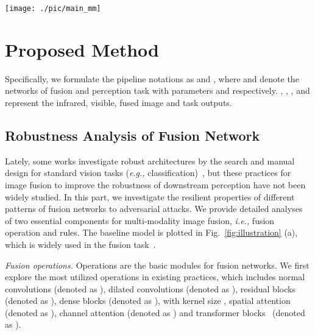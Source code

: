 \documentclass[sigconf]{acmart}
\begin{document}
\begin{figure*}[htb]
	\centering
	\texttt{[image: ./pic/main\_mm]}
	\vspace{-0.4cm}
	\caption{{The schematic graph of the proposed framework. We first illustrate the pipeline to evaluate the robustness of diverse fusion operations and rules for segmentation in subfigure (a). In subfigure (b), we propose a decomposition-based network with a harmonized search strategy for robust architecture. Finally, we depict the adaptive adversarial training in subfigure (c).}}
	\label{fig:illustration}
\end{figure*}

\section{Proposed Method}
Specifically, we  formulate the pipeline notations as   and
, where  and  denote the networks of fusion and perception task with parameters  and  respectively. , , , and  represent the infrared, visible, fused image and task outputs. 




\subsection{Robustness Analysis of Fusion Network}
Lately, some works investigate robust architectures by the search and manual design for standard vision tasks (\textit{e.g.,} classification)~\cite{su2018robustness,mao2022towards}, but these practices for image fusion to improve the robustness of downstream perception have not been widely studied.
In this part, we investigate the resilient properties of different patterns of fusion networks to adversarial attacks.
We provide detailed analyses of two essential components for multi-modality image fusion, \textit{i.e.,} fusion operation and rules. The baseline model is plotted in Fig.~\ref{fig:illustration} (a), which is widely used in the fusion task~\cite{li2018densefuse,zhao2020didfuse,TarDAL}. 



\textit{Fusion operations.} Operations are the basic modules for fusion networks. We first explore the most utilized operations in existing practices, which includes normal convolutions (denoted as ), dilated convolutions (denoted as ), residual blocks (denoted as ), dense blocks (denoted as ), with kernel size ,
spatial attention (denoted as ), channel attention (denoted as )  and transformer blocks~\cite{wu2022breaking} (denoted as ). 
\end{document}
